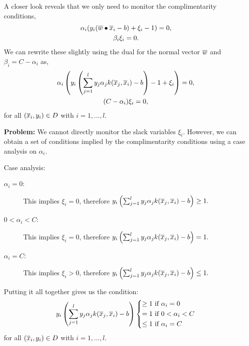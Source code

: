 \documentclass[a4paper,blends,pdf,colorBG,slideColor]{prosper}
\begin{document}
\small
A closer look reveals that we only need to monitor the complimentarity conditions,
\begin{gather*}
\alpha_i (y_i(\overline{w}\bullet\overline{x}_i - b) + \xi_i -1)= 0, \\
\beta_i\xi_i = 0.
\end{gather*}
We can rewrite these slightly using the dual for the normal vector $\overline{w}$ and
$\beta_i = C - \alpha_i$ as,
\begin{gather*}
\alpha_i\left( y_i\left ( \sum_{j=1}^l y_j \alpha_j k(\overline{x}_j,\overline{x}_i) - b\right ) - 1 + \xi_i\right ) = 0,\\
(C - \alpha_i)\xi_i = 0,
\end{gather*}
for all $(\overline{x}_i,y_i)\in D$ with $i = 1,\ldots,l$.

\vspace{.2in}
{\bf Problem:} We cannot directly monitor the slack variables $\xi_i$.  However,
we can obtain a set of conditions implied by the complimentarity conditions using
a case analysis on $\alpha_i$.
\es

\vspace{.2in}
Case analysis:
\begin{description}
\item[$\alpha_i = 0$:] This implies $\xi_i = 0$, therefore
$ %
y_i\left (\sum_{j=1}^l y_j \alpha_j k(\ol{x}_j,\ol{x}_i) - b\right ) \ge 1.
$ %
\item[$0 < \alpha_i < C$:] This implies $\xi_i = 0$, therefore
$ %
y_i\left (\sum_{j=1}^l y_j \alpha_j k(\ol{x}_j,\ol{x}_i) - b\right ) = 1.
$ %
\item[$\alpha_i = C$:] This implies $\xi_i > 0$, therefore
$ %
y_i\left (\sum_{j=1}^l y_j \alpha_j k(\ol{x}_j,\ol{x}_i) - b\right ) \le 1.
$ %
\end{description}
\es

\vspace{.2in}
Putting it all together gives us the condition:
\begin{equation*}
y_i\left (\sum_{j=1}^l y_j \alpha_j k(\overline{x}_j,\overline{x}_i) - b\right ) \left \{ 
\begin{aligned}
\ge 1 & \text{ if $\alpha_i = 0$}\\
= 1 & \text{ if $0 < \alpha_i < C$}\\
\le 1 & \text{ if $\alpha_i = C$}
\end{aligned}
\right .
\end{equation*}
for all $(\overline{x}_i,y_i)\in D$ with $i = 1,\ldots,l$.
\end{document}
